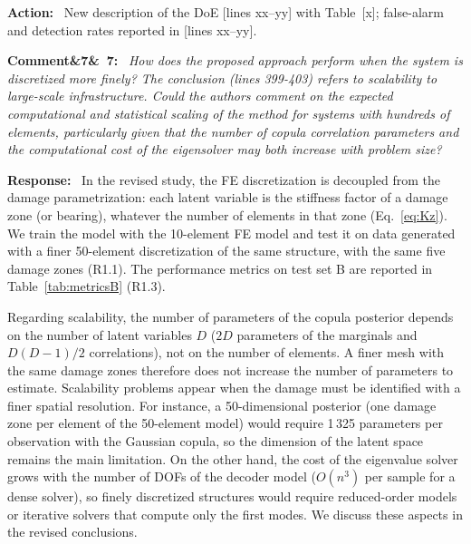 \documentclass[11pt]{article}
\newenvironment{rcomment}[1]{\par\bigskip\noindent\textbf{Comment\ifx&#1&\else\ #1\fi:}\ \itshape}{\par}
\newenvironment{response}{\par\smallskip\noindent\color{resp}\textbf{Response:}\ }{\par}
\newenvironment{action}{\par\smallskip\noindent\color{resp}\textbf{Action:}\ }{\par}
\newcommand{\tbd}[1]{\textcolor{note}{\textsf{[#1]}}}
\newcommand{\lines}[1]{\tbd{lines #1}}
\begin{document}
\begin{action}
New description of the DoE \lines{xx--yy} with Table~\tbd{x}; false-alarm and detection rates reported in
\lines{xx--yy}.
\end{action}

\begin{rcomment}{7}
How does the proposed approach perform when the system is discretized more finely? The conclusion (lines 399-403)
refers to scalability to large-scale infrastructure. Could the authors comment on the expected computational and
statistical scaling of the method for systems with hundreds of elements, particularly given that the number of copula
correlation parameters and the computational cost of the eigensolver may both increase with problem size?
\end{rcomment}

\begin{response}
In the revised study, the FE discretization is decoupled from the damage parametrization: each latent variable is the
stiffness factor of a damage zone (or bearing), whatever the number of elements in that zone (Eq.~\eqref{eq:Kz}). We train
the model with the 10-element FE model and test it on data generated with a finer 50-element discretization of the same
structure, with the same five damage zones (R1.1).
The performance metrics on test set B are reported in Table~\ref{tab:metricsB} (R1.3).

Regarding scalability, the number of parameters of the copula posterior depends on the number of latent variables $D$
($2D$ parameters of the marginals and $D(D-1)/2$ correlations), not on the number of elements. A finer mesh with the same
damage zones therefore does not increase the number of parameters to estimate. Scalability problems appear when the damage
must be identified with a finer spatial resolution. For instance, a 50-dimensional posterior (one damage zone per element of
the 50-element model) would require 1\,325 parameters per observation with the Gaussian copula, so the dimension of the latent space
remains the main limitation. On the other hand, the cost of the
eigenvalue solver grows with the number of DOFs of the decoder model ($O(n^3)$ per sample for a dense solver), so finely
discretized structures would require reduced-order models or iterative solvers that compute only the first modes. We
discuss these aspects in the revised conclusions.
\end{response}
\end{document}
